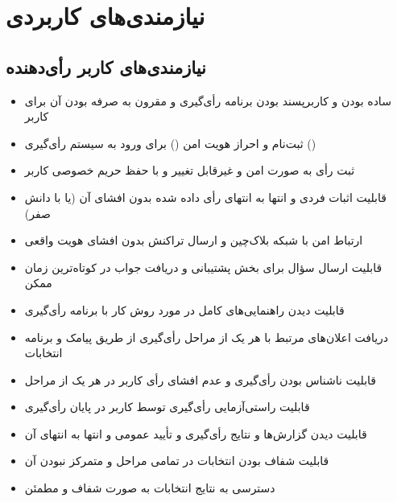 \documentclass[12pt]{article}
\begin{document}
\section{نیازمندی‌های کاربردی}

\subsection{نیازمندی‌های کاربر رأی‌دهنده}
\begin{itemize}[leftmargin=*]
\item
ساده بودن و کاربرپسند بودن برنامه رأی‌گیری و مقرون به صرفه بودن آن برای کاربر
\item
ثبت‌نام و احراز هویت امن 
()
برای ورود به سیستم رأی‌گیری
()
\item
ثبت رأی به صورت امن و غیرقابل تغییر و با حفظ حریم خصوصی کاربر
\item
قابلیت اثبات فردی و انتها به انتهای رأی داده شده بدون افشای آن (یا با دانش صفر)
\item
ارتباط امن با شبکه بلاک‌چین و ارسال تراکنش بدون افشای هویت واقعی
\item
قابلیت ارسال سؤال برای بخش پشتیبانی و دریافت جواب در کوتاه‌ترین زمان ممکن
\item
قابلیت دیدن راهنمایی‌های کامل در مورد روش کار با برنامه رأی‌گیری
\item
دریافت اعلان‌های مرتبط با هر یک از مراحل رأی‌گیری از طریق پیامک و برنامه انتخابات
\item
قابلیت ناشناس بودن رأی‌گیری و عدم افشای رأی کاربر در هر یک از مراحل
\item
قابلیت راستی‌آزمایی رأی‌گیری توسط کاربر در پایان رأی‌گیری
\item
قابلیت دیدن گزارش‌ها و نتایج رأی‌گیری و تأیید عمومی و انتها به انتهای آن
\item
قابلیت شفاف بودن انتخابات در تمامی مراحل و متمرکز نبودن آن
\item
دسترسی به نتایج انتخابات به صورت شفاف و مطمئن
\end{itemize}
\end{document}
